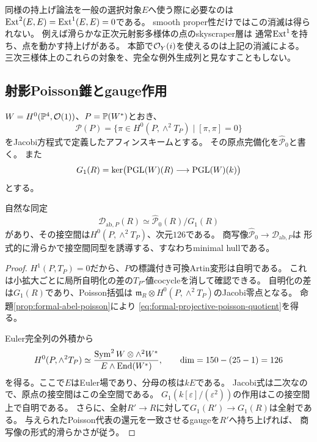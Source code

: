 \begin{remark}
同様の持上げ論法を一般の選択対象$E$へ使う際に必要なのは
$\operatorname{Ext}^2(E,E)=\operatorname{Ext}^1(E,E)=0$である。
smooth proper性だけではこの消滅は得られない。
例えば滑らかな正次元射影多様体の点のskyscraper層は
通常$\operatorname{Ext}^1$を持ち、点を動かす持上げがある。
本節で$\mathcal O_Y(i)$を使えるのは上記の消滅による。
三次三様体上のこれらの対象を、完全な例外生成列と見なすこともしない。
\end{remark}

\subsection{射影Poisson錐とgauge作用}

$W=H^0(\mathbb P^4,\mathcal O(1))$、$P=\mathbb P(W^*)$とおき、
\[
 \mathcal P(P)=
 \{\pi\in H^0(P,\wedge^2T_P)\mid[\pi,\pi]=0\}
\]
をJacobi方程式で定義したアフィンスキームとする。
その原点完備化を$\widehat{\mathcal P}_0$と書く。
また
\[
 G_1(R)=\ker\bigl(\mathrm{PGL}(W)(R)\longrightarrow\mathrm{PGL}(W)(k)\bigr)
\]
とする。

\begin{proposition}[全Artin上の射影Poisson表示]
\label{prop:formal-projective-poisson-quotient}
自然な同定
\begin{equation}\label{eq:formal-projective-poisson-quotient}
 \mathcal D_{\mathrm{ab},P}(R)
 \simeq\widehat{\mathcal P}_0(R)/G_1(R)
\end{equation}
があり、その接空間は$H^0(P,\wedge^2T_P)$、次元$126$である。
商写像$\widehat{\mathcal P}_0\to\mathcal D_{\mathrm{ab},P}$は
形式的に滑らかで接空間同型を誘導する、すなわちminimal hullである。
\end{proposition}
\begin{proof}
$H^1(P,T_P)=0$だから、$P$の標識付き可換Artin変形は自明である。
これは小拡大ごとに局所自明化の差の$T_P$-値cocycleを消して確認できる。
自明化の差は$G_1(R)$であり、Poisson括弧は
$\mathfrak m_R\otimes H^0(P,\wedge^2T_P)$のJacobi零点となる。
命題\ref{prop:formal-abel-poisson}により
\eqref{eq:formal-projective-poisson-quotient}を得る。

Euler完全列の外積から
\[
 H^0(P,\wedge^2T_P)
 \simeq
 \frac{\operatorname{Sym}^2W\otimes\wedge^2W^*}
 {E\wedge\operatorname{End}(W^*)},\qquad
 \dim=150-(25-1)=126
\]
を得る。ここで$E$はEuler場であり、分母の核は$kE$である。
Jacobi式は二次なので、原点の接空間はこの全空間である。
$G_1(k[\varepsilon]/(\varepsilon^2))$の作用はこの接空間上で自明である。
さらに、全射$R'\to R$に対して$G_1(R')\to G_1(R)$は全射である。
与えられたPoisson代表の還元を一致させるgaugeを$R'$へ持ち上げれば、
商写像の形式的滑らかさが従う。
\end{proof}

